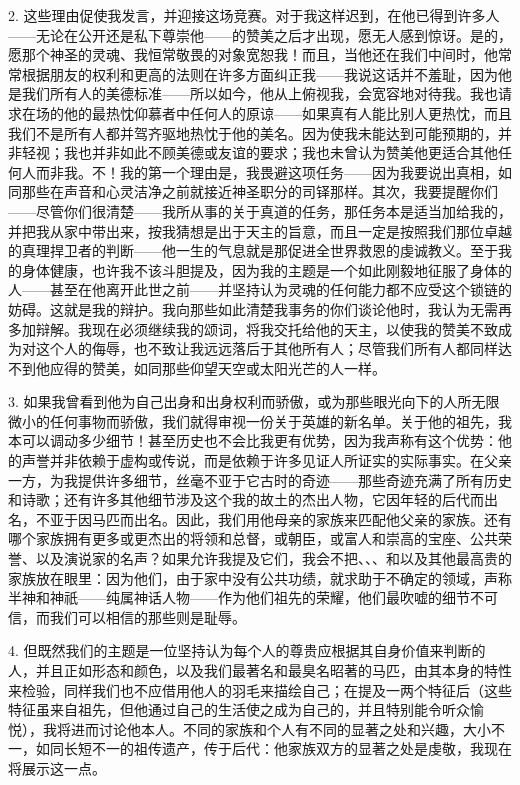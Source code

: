 2. 这些理由促使我发言，并迎接这场竞赛。对于我这样迟到，在他已得到许多人——无论在公开还是私下尊崇他——的赞美之后才出现，愿无人感到惊讶。是的，愿那个神圣的灵魂、我恒常敬畏的对象宽恕我！而且，当他还在我们中间时，他常常根据朋友的权利和更高的法则在许多方面纠正我——我说这话并不羞耻，因为他是我们所有人的美德标准——所以如今，他从上俯视我，会宽容地对待我。我也请求在场的他的最热忱仰慕者中任何人的原谅——如果真有人能比别人更热忱，而且我们不是所有人都并驾齐驱地热忱于他的美名。因为使我未能达到可能预期的，并非轻视；我也并非如此不顾美德或友谊的要求；我也未曾认为赞美他更适合其他任何人而非我。不！我的第一个理由是，我畏避这项任务——因为我要说出真相，如同那些在声音和心灵洁净之前就接近神圣职分的司铎那样。其次，我要提醒你们——尽管你们很清楚——我所从事的关于真道的任务，那任务本是适当加给我的，并把我从家中带出来，按我猜想是出于天主的旨意，而且一定是按照我们那位卓越的真理捍卫者的判断——他一生的气息就是那促进全世界救恩的虔诚教义。至于我的身体健康，也许我不该斗胆提及，因为我的主题是一个如此刚毅地征服了身体的人——甚至在他离开此世之前——并坚持认为灵魂的任何能力都不应受这个锁链的妨碍。这就是我的辩护。我向那些如此清楚我事务的你们谈论他时，我认为无需再多加辩解。我现在必须继续我的颂词，将我交托给他的天主，以使我的赞美不致成为对这个人的侮辱，也不致让我远远落后于其他所有人；尽管我们所有人都同样达不到他应得的赞美，如同那些仰望天空或太阳光芒的人一样。\par

3. 如果我曾看到他为自己出身和出身权利而骄傲，或为那些眼光向下的人所无限微小的任何事物而骄傲，我们就得审视一份关于英雄的新名单。关于他的祖先，我本可以调动多少细节！甚至历史也不会比我更有优势，因为我声称有这个优势：他的声誉并非依赖于虚构或传说，而是依赖于许多见证人所证实的实际事实。在父亲一方，为我提供许多细节，丝毫不亚于它古时的奇迹——那些奇迹充满了所有历史和诗歌；还有许多其他细节涉及这个我的故土的杰出人物，它因年轻的后代而出名，不亚于因马匹而出名。因此，我们用他母亲的家族来匹配他父亲的家族。还有哪个家族拥有更多或更杰出的将领和总督，或朝臣，或富人和崇高的宝座、公共荣誉、以及演说家的名声？如果允许我提及它们，我会不把、、、和以及其他最高贵的家族放在眼里：因为他们，由于家中没有公共功绩，就求助于不确定的领域，声称半神和神祇——纯属神话人物——作为他们祖先的荣耀，他们最吹嘘的细节不可信，而我们可以相信的那些则是耻辱。\par

4. 但既然我们的主题是一位坚持认为每个人的尊贵应根据其自身价值来判断的人，并且正如形态和颜色，以及我们最著名和最臭名昭著的马匹，由其本身的特性来检验，同样我们也不应借用他人的羽毛来描绘自己；在提及一两个特征后（这些特征虽来自祖先，但他通过自己的生活使之成为自己的，并且特别能令听众愉悦），我将进而讨论他本人。不同的家族和个人有不同的显著之处和兴趣，大小不一，如同长短不一的祖传遗产，传于后代：他家族双方的显著之处是虔敬，我现在将展示这一点。\par

